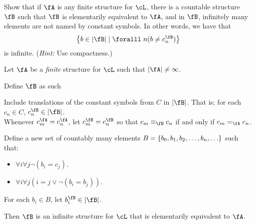 \begin{problem}
  Show that if $\fA$ is any finite structure for $\cL$, there is a countable
  structure $\fB$ such that $\fB$ is elementarily equivalent to $\fA$,
  and in $\fB$, infinitely many elements are not named by constant symbols.
  In other words, we have that
  \[ \set{b \in \abs{\fB} \mid \forall n (b \ne c_n^\fB)} \] is infinite.
  (\emph{Hint: } Use compactness.)

\end{problem}
\begin{Answer}
  Let $\fA$ be a \emph{finite} structure for $\cL$
  such that $\abs{\fA} \ne \infty$.

  \step
  Define $\fB$ as such
  \begin{enumroman}
    \item Include translations of the constant symbols from
      $C$ in $\abs{\fB}$. That is; for each $c_n \in C$,
      $c_n^\fB \in \abs{\fB}$.\\
      Whenever $c_m^\fA = c_n^\fA$, let $c_m^\fB = c_n^\fB$
      so that  $c_m \equiv_\fB c_n$ if and only if $c_m =_\fA c_n$.
    \item Define a new set of countably many elements
      $B = \left\{b_0, b_1, b_2, \ldots, b_n, \ldots\right\}$ such that:
      \begin{itemize}
        \item $\forall i \forall j \lnot (b_i = c_j)$.
        \item $\forall i \forall j (i = j \lor \lnot (b_i = b_j))$.
      \end{itemize}
    \item For each $b_i \in B$, let $b_i^\fB \in \abs{\fB}$.
  \end{enumroman}

  \step
  Then $\fB$ is an infinite structure for $\cL$ that is elementarily
  equivalent to $\fA$.
\end{Answer}
